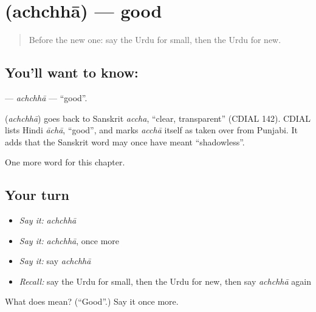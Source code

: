 \section[\texorpdfstring{\ur{اچھا} (achchhā)}{اچھا (achchhā)}]{ (achchhā) — good}

\label{lesson:UR-C70-achchha}



\begin{quote}
Before the new one: say the Urdu for small, then the Urdu for new.
\end{quote}

\subsection*{You'll want to know: }
\textbf{} — \emph{achchhā} — \textquotedblleft{}good\textquotedblright{}.

\begin{cousinweb}
\textbf{} (\emph{achchhā}) goes back to Sanskrit \emph{accha}, \textquotedblleft{}clear, transparent\textquotedblright{} (CDIAL 142). CDIAL lists Hindi \emph{āchā}, \textquotedblleft{}good\textquotedblright{}, and marks \emph{acchā} itself as taken over from Punjabi. It adds that the Sanskrit word may once have meant \textquotedblleft{}shadowless\textquotedblright{}.
\end{cousinweb}

\begin{grammarlens}[title={What you've built}]
One more word for this chapter.
\end{grammarlens}

\subsection*{Your turn}
\begin{itemize}
\raggedright
  \item \emph{Say it:} \emph{achchhā}
  \item \emph{Say it:} \emph{achchhā}, once more
  \item \emph{Say it:} say \emph{achchhā}
  \item \emph{Recall:} say the Urdu for small, then the Urdu for new, then say \emph{achchhā} again
\end{itemize}

\begin{tcolorbox}[breakable,colback=teal!4,colframe=teal!35!black,title={Before you move on}]
What does  mean? (\textquotedblleft{}Good\textquotedblright{}.) Say it once more.
\end{tcolorbox}
